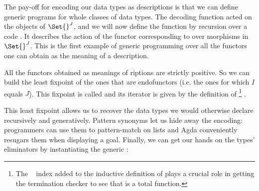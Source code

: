 The pay-off for encoding our data types as descriptions is that we can define
generic programs for whole classes of data types. The decoding function 
acted on the objects of $\Set{}^J$, and we will now define the function  by
recursion over a code . It describes the action of the functor corresponding
to  over morphisms in $\Set{}^J$. This is the first example of generic
programming over all the functors one can obtain as the meaning of a description.

\begin{agdasnippet}
\end{agdasnippet}

All the functors obtained as meanings of riptions are strictly
positive. So we can build the least fixpoint of the ones that are endofunctors
(i.e. the ones for which $I$ equals $J$). This fixpoint is called 
and its iterator is given by the definition of  %
\footnote{The ~\cite{DBLP:journals/corr/abs-1012-4896} index added
to the inductive definition of  plays a crucial role in getting the
termination checker to see that  is a total function.
}
.

\begin{agdasnippet}
\end{agdasnippet}

This least fixpoint allows us to recover the data types we would
otherwise declare recursively and generatively. Pattern synonyms let us hide away the
encoding: programmers can use them to pattern-match on lists and Agda
conveniently resugars them when displaying a goal. Finally, we can get
our hands on the types' eliminators by instantiating the generic
:

\noindent
\begin{minipage}{0.95\textwidth}
\begin{minipage}[t]{0.48\textwidth}
\end{minipage}
\begin{minipage}[t]{0.50\textwidth}
\end{minipage}
\end{minipage}

